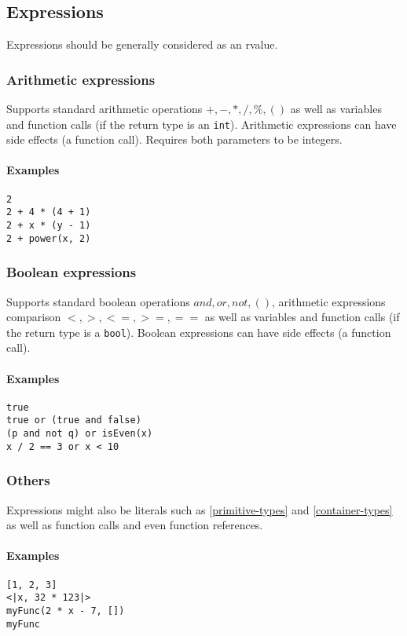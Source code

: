 \documentclass{article}
\begin{document}
\subsection{Expressions}
Expressions should be generally considered as an rvalue.

\subsubsection{Arithmetic expressions}
Supports standard arithmetic operations $+, -, *, /, \%, ()$ as well as
variables and function calls (if the return type is an \texttt{int}). Arithmetic
expressions can have side effects (a function call). Requires both parameters to
be integers.

\paragraph{Examples}
\texttt{2} \\
\texttt{2 + 4 * (4 + 1)} \\
\texttt{2 + x * (y - 1)} \\
\texttt{2 + power(x, 2)}

\subsubsection{Boolean expressions}
Supports standard boolean operations $and, or, not, ()$, arithmetic expressions
comparison $<, >, <=, >=, ==$ as well as variables and function calls (if the
return type is a \texttt{bool}). Boolean expressions can have side effects
(a function call).

\paragraph{Examples}
\texttt{true} \\
\texttt{true or (true and false)} \\
\texttt{(p and not q) or isEven(x)} \\
\texttt{x / 2 == 3 or x < 10}

\subsubsection{Others}
Expressions might also be literals such as \ref{primitive-types} and
\ref{container-types} as well as function calls and even function references.

\paragraph{Examples}
\texttt{[1, 2, 3]} \\
\texttt{<|x, 32 * 123|>} \\
\texttt{myFunc(2 * x - 7, [])} \\
\texttt{myFunc}
\end{document}
